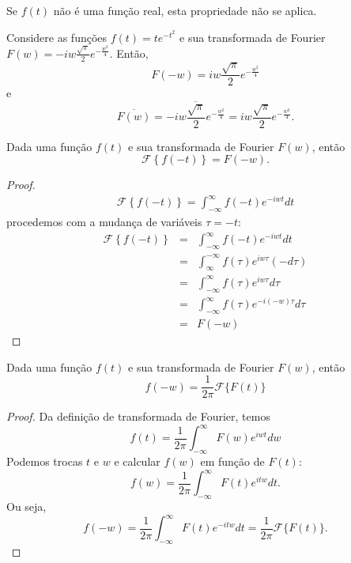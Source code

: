 \begin{obs} Se $f(t)$ não é uma função real, esta propriedade não se aplica.
\end{obs}
\begin{ex}Considere as funções $f(t)=te^{-t^2}$ e sua transformada de Fourier $F(w)=-iw\frac{\sqrt{\pi}}{2}e^{-\frac{w^2}{4}}$. Então,
$$
F(-w)=iw\frac{\sqrt{\pi}}{2}e^{-\frac{w^2}{4}}
$$
e
$$
\overline{F(w)}=\overline{-iw\frac{\sqrt{\pi}}{2}e^{-\frac{w^2}{4}}}=iw\frac{\sqrt{\pi}}{2}e^{-\frac{w^2}{4}}.
$$
\end{ex}

\begin{propr}\label{prop_inv_temp} Dada uma função $f(t)$ e sua transformada de Fourier $F(w)$, então $$\mathcal{F}\left\{f(-t)\right\}=F(-w).$$
\end{propr}
\begin{proof}
\begin{eqnarray*}
\mathcal{F}\left\{f(-t)\right\}=\int_{-\infty}^\infty f(-t) e^{-iwt}dt
\end{eqnarray*}
procedemos com a mudança de variáveis $\tau=-t$:
\begin{eqnarray*}
\mathcal{F}\left\{f(-t)\right\}&=&\int_{-\infty}^\infty f(-t) e^{-iwt}dt\\
&=&\int_{\infty}^{-\infty} f(\tau) e^{iw\tau}(-d\tau) \\
&=&\int_{-\infty}^{\infty} f(\tau) e^{iw\tau}d\tau \\
&=&\int_{-\infty}^{\infty} f(\tau) e^{-i(-w)\tau}d\tau \\
&=&F(-w)
\end{eqnarray*}
\end{proof}



\begin{propr}\label{prop_sim_dua} Dada uma função $f(t)$ e sua transformada de Fourier $F(w)$, então 
$$
f(-w)=\frac{1}{2\pi}\mathcal{F}\{F(t)\}
$$
\end{propr}
\begin{proof} Da definição de transformada de Fourier, temos
$$
f(t)=\frac{1}{2\pi}\int_{-\infty}^{\infty} F(w)e^{iwt}dw
$$
Podemos trocas $t$ e $w$ e calcular $f(w)$ em função de $F(t)$:
$$
f(w)=\frac{1}{2\pi}\int_{-\infty}^{\infty} F(t)e^{itw}dt.
$$
Ou seja, 
$$
f(-w)=\frac{1}{2\pi}\int_{-\infty}^{\infty} F(t)e^{-itw}dt=\frac{1}{2\pi}\mathcal{F}\{F(t)\}.
$$

\end{proof}

